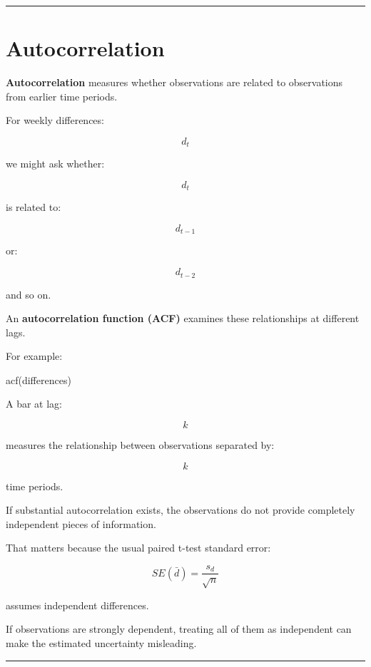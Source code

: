 \documentclass[
  letterpaper,
  DIV=11,
  numbers=noendperiod]{scrreprt}
\newenvironment{Shaded}{\begin{snugshade}}{\end{snugshade}}
\newcommand{\FunctionTok}[1]{\textcolor[rgb]{0.28,0.35,0.67}{#1}}
\newcommand{\NormalTok}[1]{\textcolor[rgb]{0.00,0.23,0.31}{#1}}
\begin{document}
\begin{center}\rule{0.5\linewidth}{0.5pt}\end{center}


\chapter{Autocorrelation}\label{autocorrelation}

\textbf{Autocorrelation} measures whether observations are related to
observations from earlier time periods.

For weekly differences:

\[
d_t
\]

we might ask whether:

\[
d_t
\]

is related to:

\[
d_{t-1}
\]

or:

\[
d_{t-2}
\]

and so on.

An \textbf{autocorrelation function (ACF)} examines these relationships
at different lags.

For example:

\begin{Shaded}
\begin{Highlighting}[]
\FunctionTok{acf}\NormalTok{(differences)}
\end{Highlighting}
\end{Shaded}

A bar at lag:

\[
k
\]

measures the relationship between observations separated by:

\[
k
\]

time periods.

If substantial autocorrelation exists, the observations do not provide
completely independent pieces of information.

That matters because the usual paired t-test standard error:

\[
SE(\bar{d})
=
\frac{s_d}{\sqrt{n}}
\]

assumes independent differences.

If observations are strongly dependent, treating all of them as
independent can make the estimated uncertainty misleading.

\begin{center}\rule{0.5\linewidth}{0.5pt}\end{center}
\end{document}
